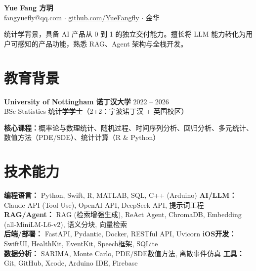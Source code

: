 \documentclass[a4paper,10pt]{article}
\newcommand{\cvheader}[4]{%
  \begin{center}
    {\LARGE\bfseries #1 \; \normalsize\color{lightgray}#2}\\[4pt]
    {\small #3 \quad $\cdot$ \quad \href{#4}{github.com/YueFangfly} \quad $\cdot$ \quad 金华}
  \end{center}
  \vspace{-4pt}
}
\newcommand{\eduentry}[4]{%
  \noindent\textbf{#1} \hfill {\small\color{lightgray}#2}\\[-2pt]
  {\small #3} \hfill {\small #4}
}
\begin{document}

\cvheader{Yue Fang}{方玥}{fangyuefly@qq.com}{https://github.com/YueFangfly}

\vspace{-6pt}
\begin{center}
{\small 统计学背景，具备 AI 产品从 0 到 1 的独立交付能力。擅长将 LLM 能力转化为用户可感知的产品功能，熟悉 RAG、Agent 架构与全栈开发。}
\end{center}
\vspace{-4pt}


\section*{教育背景}

\eduentry{University of Nottingham 诺丁汉大学}{2022 -- 2026}{BSc Statistics 统计学学士（2+2：宁波诺丁汉 + 英国校区）}{}

\vspace{2pt}
{\small\color{lightgray}\textbf{核心课程：}\color{black}概率论与数理统计、随机过程、时间序列分析、回归分析、多元统计、数值方法（PDE/SDE）、统计计算（R \& Python）}


\section*{技术能力}

\vspace{1pt}
{\small
\textbf{编程语言：} Python, Swift, R, MATLAB, SQL, C++ (Arduino) \quad
\textbf{AI/LLM：} Claude API (Tool Use), OpenAI API, DeepSeek API, 提示词工程 \\[2pt]
\textbf{RAG/Agent：} RAG (检索增强生成), ReAct Agent, ChromaDB, Embedding (all-MiniLM-L6-v2), 语义分块, 向量检索 \\[2pt]
\textbf{后端/部署：} FastAPI, Pydantic, Docker, RESTful API, Uvicorn \quad
\textbf{iOS开发：} SwiftUI, HealthKit, EventKit, Speech框架, SQLite \\[2pt]
\textbf{数据分析：} SARIMA, Monte Carlo, PDE/SDE数值方法, 离散事件仿真 \quad
\textbf{工具：} Git, GitHub, Xcode, Arduino IDE, Firebase
}

\end{document}
